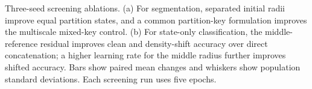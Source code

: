 \caption{Three-seed screening ablations. (a) For segmentation, separated initial radii improve equal partition states, and a common partition-key formulation improves the multiscale mixed-key control. (b) For state-only classification, the middle-reference residual improves clean and density-shift accuracy over direct concatenation; a higher learning rate for the middle radius further improves shifted accuracy. Bars show paired mean changes and whiskers show population standard deviations. Each screening run uses five epochs.}
\label{fig:architecture_ablation}
